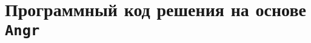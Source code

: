 \documentclass[a4paper,12pt]{report}
\begin{document}
% 

\tableofcontents



% 
\clearpage
% 
% 



\appendix
\chapter{Программный код решения на основе \texttt{Angr}}
\end{document}
